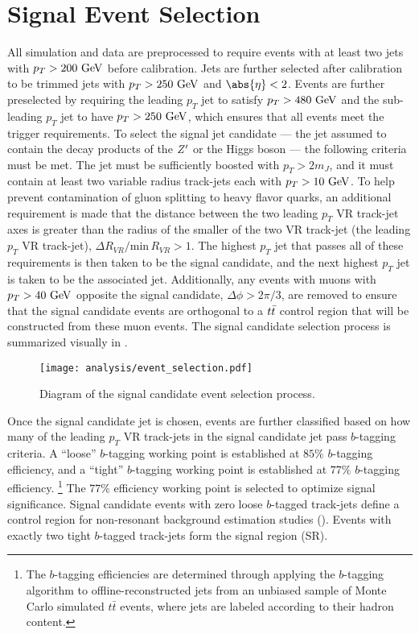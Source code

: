 \section{Signal Event Selection}\label{sec:event_selection}

All simulation and data are preprocessed to require events with at least two \largeR{} jets with $p_{T} > 200~\mathrm{GeV}$ before calibration.
Jets are further selected after calibration to be trimmed \largeR{} jets with $p_{T} > 250~\mathrm{GeV}$ and $\abs{\eta} < 2$.
Events are further preselected by requiring the leading $p_{T}$ \largeR{} jet to satisfy $p_{T} > 480~\mathrm{GeV}$ and the sub-leading $p_{T}$ \largeR{} jet to have $p_{T} > 250~\mathrm{GeV}$, which ensures that all events meet the trigger requirements.
To select the signal jet candidate --- the \largeR{} jet assumed to contain the decay products of the $Z'$ or the Higgs boson --- the following criteria must be met.
The \largeR{} jet must be sufficiently boosted with $p_{T} > 2m_{J}$, and it must contain at least two variable radius track-jets each with $p_{T} > 10~\mathrm{GeV}$.
To help prevent contamination of gluon splitting to heavy flavor quarks, an additional requirement is made that the distance between the two leading $p_{T}$ VR track-jet axes is greater than the radius of the smaller of the two VR track-jet (the leading $p_{T}$ VR track-jet), $\Delta R_{VR}/\mathrm{min\,} R_{VR} > 1$.
The highest $p_{T}$ \largeR{} jet that passes all of these requirements is then taken to be the signal candidate, and the next highest $p_{T}$ \largeR{} jet is taken to be the associated jet.
Additionally, any events with muons with $p_{T} > 40~\mathrm{GeV}$ opposite the signal candidate, $\Delta \phi > 2\pi/3$, are removed to ensure that the signal candidate events are orthogonal to a $t\bar{t}$ control region that will be constructed from these muon events.
The signal candidate selection process is summarized visually in .

\begin{figure}[htbp]
 \centering
 \texttt{[image: analysis/event\_selection.pdf]}
 \caption[Diagram of the signal candidate event selection process.]{%
  Diagram of the signal candidate event selection process.}
 \label{fig:event_selection}
\end{figure}

Once the signal candidate jet is chosen, events are further classified based on how many of the leading $p_{T}$ VR track-jets in the signal candidate \largeR{} jet pass $b$-tagging criteria.
A ``loose'' $b$-tagging working point is established at $85\%$ $b$-tagging efficiency, and a ``tight'' $b$-tagging working point is established at $77\%$ $b$-tagging efficiency.%
\footnote{The $b$-tagging efficiencies are determined through applying the $b$-tagging algorithm to offline-reconstructed jets from an unbiased sample of Monte Carlo simulated $t\bar{t}$ events, where jets are labeled according to their hadron content.}
The $77\%$ efficiency working point is selected to optimize signal significance.
Signal candidate events with zero loose $b$-tagged track-jets define a control region for non-resonant background estimation studies (\CRQCD).
Events with exactly two tight $b$-tagged track-jets form the signal region (SR).

